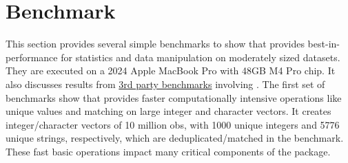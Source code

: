 \documentclass[nojss]{jss} %
\newcommand{\fct}[1]{\code{#1()}}
\begin{document}
\section{Benchmark} \label{sec:bench}
%
This section provides several simple benchmarks to show that  provides best-in- performance for statistics and data manipulation on moderately sized datasets. They are executed on a 2024 Apple MacBook Pro with 48GB M4 Pro chip. It also discusses results from \href{https://github.com/fastverse/fastverse/wiki/Benchmarks}{3rd party benchmarks} involving . The first set of benchmarks show that  provides faster computationally intensive operations like unique values and matching on large integer and character vectors. It creates integer/character vectors of 10 million obs, with 1000 unique integers and 5776 unique strings, respectively, which are deduplicated/matched in the benchmark. These fast basic operations impact many critical components of the package. %
%
\end{document}
